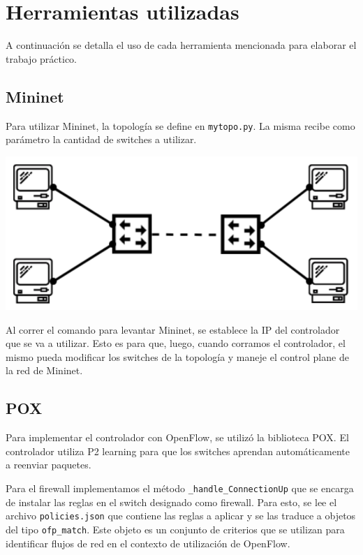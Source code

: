 \documentclass{article}
\begin{document}
\section{Herramientas utilizadas}\label{implementacion-wip}
A continuación se detalla el uso de cada herramienta mencionada para elaborar el trabajo práctico.

\subsection{Mininet}\label{mininet}

Para utilizar Mininet, la topología se define en \texttt{mytopo.py}. La misma recibe como parámetro la cantidad de switches a utilizar.

\begin{center}
\includegraphics[scale=0.35]{mininet_topo.png}
\end{center}

Al correr el comando para levantar Mininet, se establece la IP del controlador que se va a utilizar. Esto es para que, luego, cuando corramos el controlador, el mismo pueda modificar los switches de la topología y maneje el control plane de la red de Mininet.

\subsection{POX }\label{pox}
Para implementar el controlador con OpenFlow, se utilizó la biblioteca POX. El controlador utiliza P2 learning para que los switches aprendan automáticamente a reenviar paquetes.

Para el firewall implementamos el método \texttt{\_handle\_ConnectionUp} que se encarga de instalar las reglas en el switch designado como firewall. Para esto, se lee el archivo \texttt{policies.json} que contiene las reglas a aplicar y se las traduce a objetos del tipo \texttt{ofp\_match}. Este objeto es un conjunto de criterios que se utilizan para identificar flujos de red en el contexto de utilización de OpenFlow. 
\end{document}
